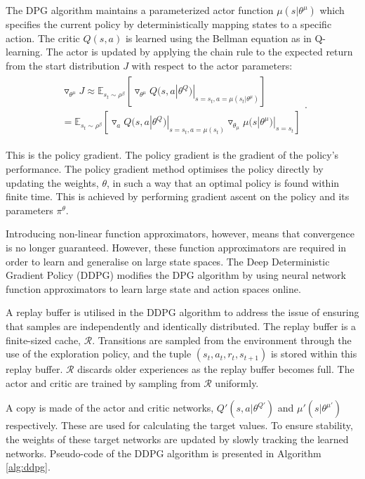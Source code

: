 The DPG algorithm maintains a parameterized actor function $\mu(s|\theta^\mu)$ which specifies the current policy by deterministically mapping states to a specific action. The critic $Q(s,a)$ is learned using the Bellman equation as in Q-learning. The actor is updated by applying the chain rule to the expected return from the start distribution $J$ with respect to the actor parameters:
\begin{align}
\begin{split}
\triangledown_{\theta^\mu}J\approx\mathbb{E}_{s_t\sim\rho^\beta}[\triangledown_{\theta^\mu}Q(s,a|\theta^Q)|_{s=s_t,a=\mu(s_t|\theta^\mu)}] \\
= \mathbb{E}_{s_t\sim\rho^\beta}[\triangledown_aQ(s,a|\theta^Q)|_{s=s_t,a=\mu(s_t)}\triangledown_{\theta_\mu}\mu(s|\theta^\mu)|_{s=s_t}]
\end{split}.
\end{align}

This is the policy gradient. The policy gradient is the gradient of the policy's performance. The policy gradient method optimises the policy directly by updating the weights, $\theta$, in such a way that an optimal policy is found within finite time. This is achieved by performing gradient ascent on the policy and its parameters $\pi^\theta$.

Introducing non-linear function approximators, however, means that convergence is no longer guaranteed. However, these function approximators are required in order to learn and generalise on large state spaces. The Deep Deterministic Gradient Policy (DDPG) modifies the DPG algorithm by using neural network function approximators to learn large state and action spaces online.

A replay buffer is utilised in the DDPG algorithm to address the issue of ensuring that samples are independently and identically distributed. The replay buffer is a finite-sized cache, $\mathcal{R}$. Transitions are sampled from the environment through the use of the exploration policy, and the tuple $(s_t,a_t,r_t,s_{t+1})$ is stored within this replay buffer. $\mathcal{R}$ discards older experiences as the replay buffer becomes full. The actor and critic are trained by sampling from $\mathcal{R}$ uniformly. 

A copy is made of the actor and critic networks, $Q'(s,a|\theta^{Q'})$ and $\mu'(s|\theta^{\mu'})$ respectively. These are used for calculating the target values. To ensure stability, the weights of these target networks are updated by slowly tracking the learned networks. Pseudo-code of the DDPG algorithm is presented in Algorithm \ref{alg:ddpg}.

